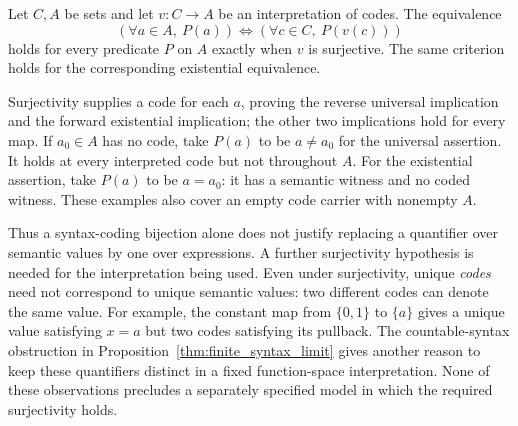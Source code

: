 \begin{proposition}
Let $C,A$ be sets and let $v:C\to A$ be an interpretation of codes.
The equivalence
\[
(\forall a\in A,\ P(a))\iff(\forall c\in C,\ P(v(c)))
\]
holds for every predicate $P$ on $A$ exactly when $v$ is surjective.
The same criterion holds for the corresponding existential equivalence.
\end{proposition}
\Proof
Surjectivity supplies a code for each $a$, proving the reverse universal
implication and the forward existential implication; the other two
implications hold for every map. If $a_0\in A$ has no code, take
$P(a)$ to be $a\ne a_0$ for the universal assertion. It holds at every
interpreted code but not throughout $A$. For the existential assertion,
take $P(a)$ to be $a=a_0$: it has a semantic witness and no coded witness.
These examples also cover an empty code carrier with nonempty $A$.
\Done

Thus a syntax-coding bijection alone does not justify replacing a
quantifier over semantic values by one over expressions. A further
surjectivity hypothesis is needed for the interpretation being used.
Even under surjectivity, unique \emph{codes} need not correspond to
unique semantic values: two different codes can denote the same value.
For example, the constant map from $\{0,1\}$ to $\{a\}$ gives a
unique value satisfying $x=a$ but two codes satisfying its pullback.
The countable-syntax obstruction in Proposition~\ref{thm:finite_syntax_limit}
gives another reason to keep these quantifiers distinct in a fixed
function-space interpretation. None of these observations precludes a
separately specified model in which the required surjectivity holds.

